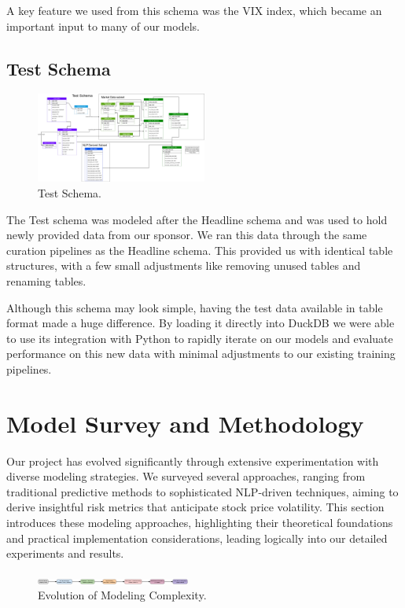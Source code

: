 \documentclass[twocolumn]{article}
\begin{document}
A key feature we used from this schema was the VIX index, which became an important input to many of our models.

\subsection{Test Schema}
\begin{figure}[h!]
    \centering
    \includegraphics[width=0.5\textwidth]{test_schema.png}
    \caption{Test Schema.}
    \label{fig:headline-schema}
\end{figure}

The Test schema was modeled after the Headline schema and was used to hold newly provided data from our sponsor. We ran this data through the same curation pipelines as the Headline schema. This provided us with identical table structures, with a few small adjustments like removing unused tables and renaming tables.

Although this schema may look simple, having the test data available in table format made a huge difference. By loading it directly into DuckDB we were able to use its integration with Python to rapidly iterate on our models and evaluate performance on this new data with minimal adjustments to our existing training pipelines.

\section{Model Survey and Methodology}

Our project has evolved significantly through extensive experimentation with diverse modeling strategies. We surveyed several approaches, ranging from traditional predictive methods to sophisticated NLP-driven techniques, aiming to derive insightful risk metrics that anticipate stock price volatility. This section introduces these modeling approaches, highlighting their theoretical foundations and practical implementation considerations, leading logically into our detailed experiments and results.

\begin{figure}[h!]
    \centering
    \includegraphics[width=0.45\textwidth]{modeling_progression_diagram.png}
    \caption{Evolution of Modeling Complexity.}
    \label{fig:modeling-evolution}
\end{figure}
\end{document}
